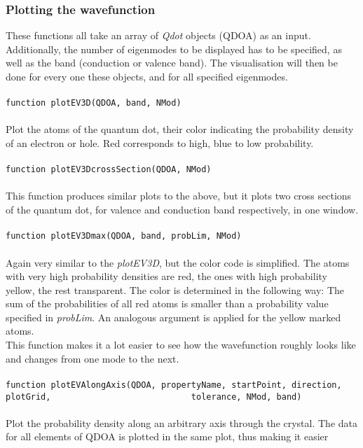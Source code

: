 	\subsubsection{Plotting the wavefunction}
		These functions all take an array of \textit{Qdot} objects (QDOA) as an input. Additionally, the number of eigenmodes to be displayed has to be specified, 
		as well as the band (conduction or valence band). The visualisation will then be done for every one these objects, and for all specified eigenmodes.\\\\
		\lstinline{function plotEV3D(QDOA, band, NMod) }\\\\
		Plot the atoms of the quantum dot, their color indicating the probability density of an electron or hole. Red corresponds to high, blue to low probability.\\\\
		\lstinline{function plotEV3DcrossSection(QDOA, NMod) }\\\\
		This function produces similar plots to the above, but it plots two cross sections of the quantum dot, for valence and conduction band respectively, 
		in one window.\\\\
		\lstinline{function plotEV3Dmax(QDOA, band, probLim, NMod)}\\\\
		Again very similar to the \textit{plotEV3D}, but the color code is simplified. The atoms with very high probability densities are red, the ones with high 
		probability yellow, the rest transparent. The color is determined in the following way: The sum of the probabilities of all red atoms is smaller than a 
		probability value specified in \textit{probLim}. An analogous argument is applied for the yellow marked atoms.\\
		This function makes it a lot easier to see how the wavefunction roughly looks like and changes from one mode to the next.\\\\
		\lstinline{function plotEVAlongAxis(QDOA, propertyName, startPoint, direction, plotGrid,                            tolerance, NMod, band)}\\\\
		Plot the probability density along an arbitrary axis through the crystal. The data for all elements of QDOA is plotted in the same plot, thus making it easier

